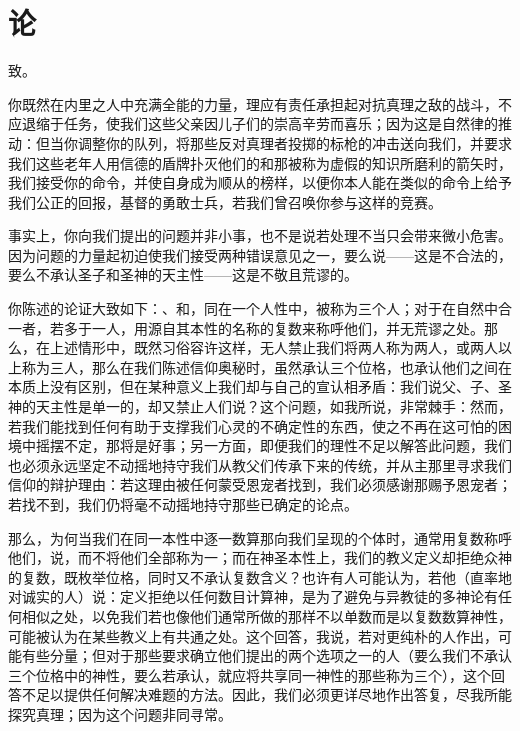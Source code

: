 
\chapter{论}


致。\par

你既然在内里之人中充满全能的力量，理应有责任承担起对抗真理之敌的战斗，不应退缩于任务，使我们这些父亲因儿子们的崇高辛劳而喜乐；因为这是自然律的推动：但当你调整你的队列，将那些反对真理者投掷的标枪的冲击送向我们，并要求我们这些老年人用信德的盾牌扑灭他们的和那被称为虚假的知识所磨利的箭矢时，我们接受你的命令，并使自身成为顺从的榜样，以便你本人能在类似的命令上给予我们公正的回报，基督的勇敢士兵，若我们曾召唤你参与这样的竞赛。\par

事实上，你向我们提出的问题并非小事，也不是说若处理不当只会带来微小危害。因为问题的力量起初迫使我们接受两种错误意见之一，要么说——这是不合法的，要么不承认圣子和圣神的天主性——这是不敬且荒谬的。\par

你陈述的论证大致如下：、和，同在一个人性中，被称为三个人；对于在自然中合一者，若多于一人，用源自其本性的名称的复数来称呼他们，并无荒谬之处。那么，在上述情形中，既然习俗容许这样，无人禁止我们将两人称为两人，或两人以上称为三人，那么在我们陈述信仰奥秘时，虽然承认三个位格，也承认他们之间在本质上没有区别，但在某种意义上我们却与自己的宣认相矛盾：我们说父、子、圣神的天主性是单一的，却又禁止人们说？这个问题，如我所说，非常棘手：然而，若我们能找到任何有助于支撑我们心灵的不确定性的东西，使之不再在这可怕的困境中摇摆不定，那将是好事；另一方面，即便我们的理性不足以解答此问题，我们也必须永远坚定不动摇地持守我们从教父们传承下来的传统，并从主那里寻求我们信仰的辩护理由：若这理由被任何蒙受恩宠者找到，我们必须感谢那赐予恩宠者；若找不到，我们仍将毫不动摇地持守那些已确定的论点。\par

那么，为何当我们在同一本性中逐一数算那向我们呈现的个体时，通常用复数称呼他们，说，而不将他们全部称为一；而在神圣本性上，我们的教义定义却拒绝众神的复数，既枚举位格，同时又不承认复数含义？也许有人可能认为，若他（直率地对诚实的人）说：定义拒绝以任何数目计算神，是为了避免与异教徒的多神论有任何相似之处，以免我们若也像他们通常所做的那样不以单数而是以复数数算神性，可能被认为在某些教义上有共通之处。这个回答，我说，若对更纯朴的人作出，可能有些分量；但对于那些要求确立他们提出的两个选项之一的人（要么我们不承认三个位格中的神性，要么若承认，就应将共享同一神性的那些称为三个），这个回答不足以提供任何解决难题的方法。因此，我们必须更详尽地作出答复，尽我所能探究真理；因为这个问题非同寻常。\par

